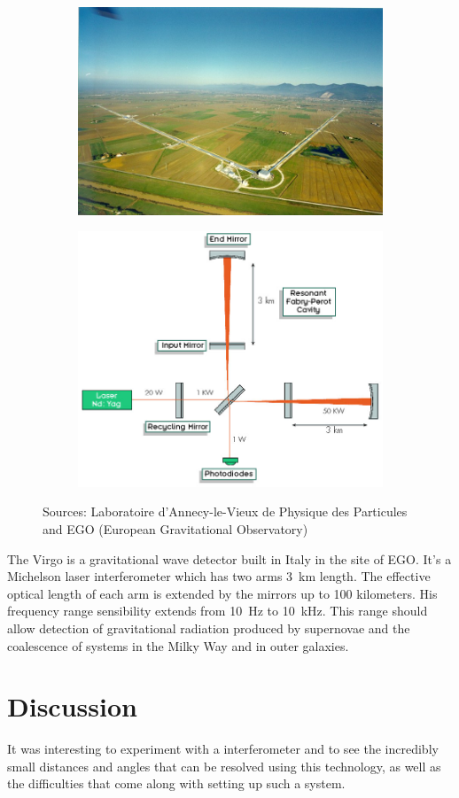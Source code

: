 \documentclass[a4paper, 12pt]{paper}
\begin{document}
\begin{figure}[H]
    \begin{subfigure}[t]{0.5\textwidth}
        \includegraphics[width=\textwidth]{img/virgoview}
    \end{subfigure}
    \begin{subfigure}[t]{0.4\textwidth}
        \includegraphics[width=\textwidth]{img/schema3.jpg}
    \end{subfigure}
    \caption{Sources: Laboratoire d’Annecy-le-Vieux de Physique des Particules and EGO (European Gravitational Observatory)}
\label{fig:web_example}
\end{figure}

The Virgo is a gravitational wave detector built in Italy in the site of EGO.
It’s a Michelson laser interferometer which has two arms \SI{3}{\kilo\meter} length.
The effective optical length of each arm is extended by the mirrors up to 100 kilometers.
His frequency range sensibility extends from \SI{10}{\hertz} to \SI{10}{\kilo\hertz}.
This range should allow detection of gravitational radiation produced by supernovae and the coalescence of systems in the Milky Way and in outer galaxies.

\section{Discussion}

It was interesting to experiment with a interferometer and to see the incredibly small distances and angles that can be resolved using this technology, as well as the difficulties that come along with setting up such a system.
\end{document}
